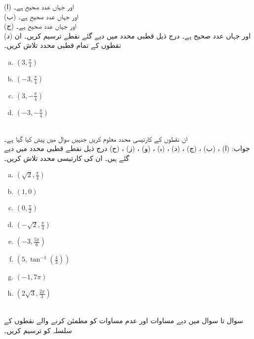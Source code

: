(ا)  اور  جہاں  عدد صحیح ہے۔\\
(ب)  اور  جہاں  عدد صحیح ہے۔\\
(ج)  اور  جہاں  عدد صحیح ہے۔\\
(د)  اور  جہاں  عدد صحیح ہے۔
درج ذیل قطبی محدد میں دیے گئے نقطے ترسیم کریں۔ ان نقطوں کے تمام قطبی محدد تلاش کریں۔ 
\begin{multicols}{4}
\begin{enumerate}[a.]
\item
$(3,\tfrac{\pi}{4})$
\item
$(-3,\tfrac{\pi}{4})$
\item
$(3,-\tfrac{\pi}{4})$
\item
$(-3,-\tfrac{\pi}{4})$
\end{enumerate}
\end{multicols}
\\
ان نقطوں کے کارتیسی محدد معلوم کریں جنہیں سوال  میں پیش کیا گیا ہے۔\\
جواب:\quad
(ا) ، (ب) ، (ج) ، (د) ، (ہ) ، (و) ، (ز) ، (ح) 
درج ذیل نقطے قطبی محدد میں دیے گئے ہیں۔ ان کی کارتیسی محدد تلاش کریں۔
\begin{multicols}{4}
\begin{enumerate}[a.]
\item
$(\sqrt{2},\tfrac{\pi}{4})$
\item
$(1,0)$
\item
$(0,\tfrac{\pi}{2})$
\item
$(-\sqrt{2},\tfrac{\pi}{4})$
\item
$(-3,\tfrac{5\pi}{6})$
\item
$(5,\tan^{-1}(\tfrac{4}{3}))$
\item
$(-1,7\pi)$
\item
$(2\sqrt{3},\tfrac{2\pi}{3})$
\end{enumerate}
\end{multicols}
\\
سوال  تا سوال  میں دیے مساوات اور عدم مساوات کو مطمئن کرنے والے نقطوں کے سلسلہ کو ترسیم کریں۔ 

